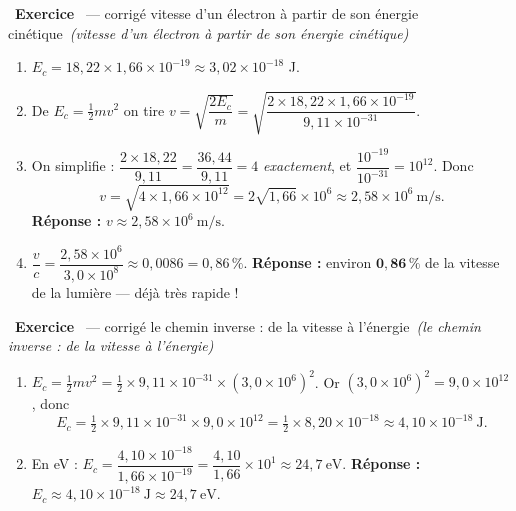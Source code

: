 \documentclass[11pt,a4paper]{article}
\newcommand{\rep}{\textbf{\color{excol}Réponse : }}
\newcounter{exo}
\newcommand{\cor}[1][]{\stepcounter{exo}\par\medskip%
  \noindent{\color{primary}\rule[-2pt]{3.5pt}{15pt}}\ \textbf{\color{primarydark}\large Exercice \theexo}%
  \ \textmd{\normalsize\color{black!55}— corrigé}%
  \ifx\relax#1\relax\relax\else\ \textmd{\normalsize\color{black!65}\itshape (#1)}\fi\par\nopagebreak\smallskip}
\begin{document}

\cor[vitesse d'un électron à partir de son énergie cinétique]
\begin{enumerate}[label=\alph*)]
  \item $E_c = 18{,}22\times1{,}66\times10^{-19} \approx 3{,}02\times10^{-18}$ J.
  \item De $E_c = \tfrac12 m v^2$ on tire $v = \sqrt{\dfrac{2E_c}{m}}
        = \sqrt{\dfrac{2\times18{,}22\times1{,}66\times10^{-19}}{9{,}11\times10^{-31}}}$.
  \item On simplifie : $\dfrac{2\times18{,}22}{9{,}11} = \dfrac{36{,}44}{9{,}11} = 4$ \emph{exactement},
        et $\dfrac{10^{-19}}{10^{-31}} = 10^{12}$. Donc
        \[ v = \sqrt{4\times1{,}66\times10^{12}} = 2\sqrt{1{,}66}\times10^{6}
             \approx 2{,}58\times10^{6}\ \text{m/s}. \]
        \rep $\boxed{v \approx 2{,}58\times10^{6}\ \text{m/s}}$.
  \item $\dfrac{v}{c} = \dfrac{2{,}58\times10^{6}}{3{,}0\times10^{8}} \approx 0{,}0086 = 0{,}86\,\%$.
        \rep environ $\mathbf{0{,}86\,\%}$ de la vitesse de la lumière — déjà très rapide !
\end{enumerate}

\cor[le chemin inverse : de la vitesse à l'énergie]
\begin{enumerate}[label=\alph*)]
  \item $E_c = \tfrac12 m v^2 = \tfrac12\times9{,}11\times10^{-31}\times(3{,}0\times10^{6})^2$.
        Or $(3{,}0\times10^{6})^2 = 9{,}0\times10^{12}$, donc
        \[ E_c = \tfrac12\times9{,}11\times10^{-31}\times9{,}0\times10^{12}
             = \tfrac12\times8{,}20\times10^{-18} \approx 4{,}10\times10^{-18}\ \text{J}. \]
  \item En eV : $E_c = \dfrac{4{,}10\times10^{-18}}{1{,}66\times10^{-19}}
        = \dfrac{4{,}10}{1{,}66}\times10^{1} \approx 24{,}7\ \text{eV}$.
        \rep $\boxed{E_c \approx 4{,}10\times10^{-18}\ \text{J} \approx 24{,}7\ \text{eV}}$.
\end{enumerate}
\end{document}
